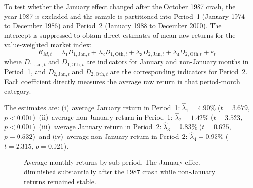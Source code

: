 \documentclass[11pt, a4paper]{article}
\begin{document}
\begin{table}[H]
	\centering
	
	\caption{Sub-period January effect regression.}\label{tab:q43_reg}
\end{table}

\begin{table}[H]
	\centering
	
	\caption{Test for difference in January returns across sub-periods.}\label{tab:q43_jan}
\end{table}

\begin{table}[H]
	\centering
	
	\caption{Test for difference in non-January returns across sub-periods.}\label{tab:q43_oth}
\end{table}

To test whether the January effect changed after the October 1987 crash, the year 1987 is excluded and the sample is partitioned into Period~1 (January 1974 to December 1986) and Period~2 (January 1988 to December 2000). The intercept is suppressed to obtain direct estimates of mean raw returns for the value-weighted market index:
\begin{equation*}
	R_{M,t} = \lambda_1 D_{1,\mathrm{Jan},t} + \lambda_2 D_{1,\mathrm{Oth},t} + \lambda_3 D_{2,\mathrm{Jan},t} + \lambda_4 D_{2,\mathrm{Oth},t} + \varepsilon_t
\end{equation*}
where \(D_{1,\mathrm{Jan},t}\) and \(D_{1,\mathrm{Oth},t}\) are indicators for January and non-January months in Period~1, and \(D_{2,\mathrm{Jan},t}\) and \(D_{2,\mathrm{Oth},t}\) are the corresponding indicators for Period~2. Each coefficient directly measures the average raw return in that period-month category.

The estimates are: (i)~average January return in Period~1: \(\hat{\lambda}_1 = 4.90\%\) (\(t = 3.679\), \(p < 0.001\)); (ii)~average non-January return in Period~1: \(\hat{\lambda}_2 = 1.42\%\) (\(t = 3.523\), \(p < 0.001\)); (iii)~average January return in Period~2: \(\hat{\lambda}_3 = 0.83\%\) (\(t = 0.625\), \(p = 0.532\)); and (iv)~average non-January return in Period~2: \(\hat{\lambda}_4 = 0.93\%\) (\(t = 2.315\), \(p = 0.021\)).

\begin{figure}[H]
	\centering
	
	\caption{Average monthly returns by sub-period. The January effect diminished substantially after the 1987 crash while non-January returns remained stable.}\label{fig:q4_structural}
\end{figure}
\end{document}

